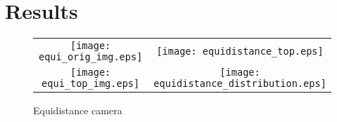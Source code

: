 \section{Results}




\begin{figure}
\centering
\begin{tabular}{cc}

\texttt{[image: equi\_orig\_img.eps]} & 

\texttt{[image: equidistance\_top.eps]}  \\
\texttt{[image: equi\_top\_img.eps]} &
\texttt{[image: equidistance\_distribution.eps]} 

\end{tabular}
\caption{Equidistance camera}
\label{fig:def_raxels}
\end{figure}
